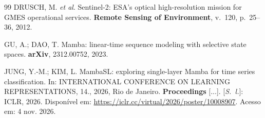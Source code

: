 \documentclass[conference]{IEEEtran}
\begin{document}
\begin{thebibliography}{99}
 DRUSCH, M. \textit{et al}. Sentinel-2: ESA's optical high-resolution mission for GMES operational services. \textbf{Remote Sensing of Environment}, v.~120, p.~25--36, 2012.


 GU, A.; DAO, T. Mamba: linear-time sequence modeling with selective state spaces. \textbf{arXiv}, 2312.00752, 2023.

 JUNG, Y.-M.; KIM, L. MambaSL: exploring single-layer Mamba for time series classification. In: INTERNATIONAL CONFERENCE ON LEARNING REPRESENTATIONS, 14., 2026, Rio de Janeiro. \textbf{Proceedings} [...]. [\textit{S.~l.}]: ICLR, 2026. Disponível em: \url{https://iclr.cc/virtual/2026/poster/10008907}. Acesso em: 4 nov. 2026.







\end{thebibliography}
\end{document}
